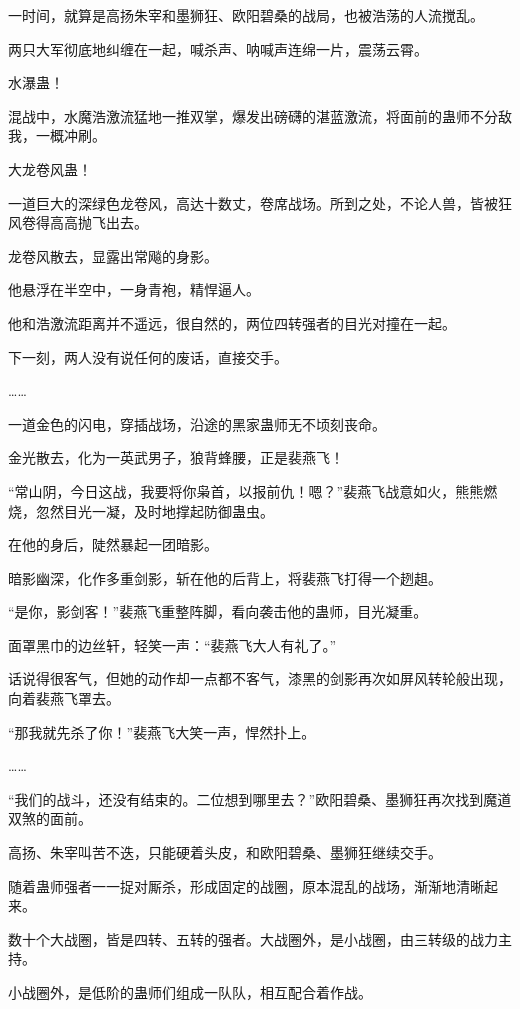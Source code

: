 
\begin{this_body}

一时间，就算是高扬朱宰和墨狮狂、欧阳碧桑的战局，也被浩荡的人流搅乱。

两只大军彻底地纠缠在一起，喊杀声、呐喊声连绵一片，震荡云霄。

水瀑蛊！

混战中，水魔浩激流猛地一推双掌，爆发出磅礴的湛蓝激流，将面前的蛊师不分敌我，一概冲刷。

大龙卷风蛊！

一道巨大的深绿色龙卷风，高达十数丈，卷席战场。所到之处，不论人兽，皆被狂风卷得高高抛飞出去。

龙卷风散去，显露出常飚的身影。

他悬浮在半空中，一身青袍，精悍逼人。

他和浩激流距离并不遥远，很自然的，两位四转强者的目光对撞在一起。

下一刻，两人没有说任何的废话，直接交手。

……

一道金色的闪电，穿插战场，沿途的黑家蛊师无不顷刻丧命。

金光散去，化为一英武男子，狼背蜂腰，正是裴燕飞！

“常山阴，今日这战，我要将你枭首，以报前仇！嗯？”裴燕飞战意如火，熊熊燃烧，忽然目光一凝，及时地撑起防御蛊虫。

在他的身后，陡然暴起一团暗影。

暗影幽深，化作多重剑影，斩在他的后背上，将裴燕飞打得一个趔趄。

“是你，影剑客！”裴燕飞重整阵脚，看向袭击他的蛊师，目光凝重。

面罩黑巾的边丝轩，轻笑一声：“裴燕飞大人有礼了。”

话说得很客气，但她的动作却一点都不客气，漆黑的剑影再次如屏风转轮般出现，向着裴燕飞罩去。

“那我就先杀了你！”裴燕飞大笑一声，悍然扑上。

……

“我们的战斗，还没有结束的。二位想到哪里去？”欧阳碧桑、墨狮狂再次找到魔道双煞的面前。

高扬、朱宰叫苦不迭，只能硬着头皮，和欧阳碧桑、墨狮狂继续交手。

随着蛊师强者一一捉对厮杀，形成固定的战圈，原本混乱的战场，渐渐地清晰起来。

数十个大战圈，皆是四转、五转的强者。大战圈外，是小战圈，由三转级的战力主持。

小战圈外，是低阶的蛊师们组成一队队，相互配合着作战。


\end{this_body}
